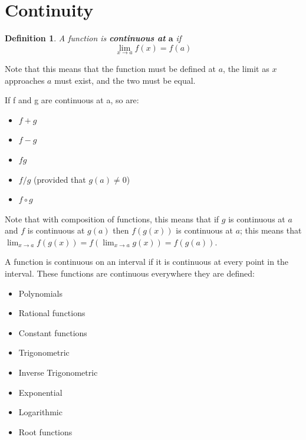 \documentclass[letterpaper, 11pt, openany]{book}
\theoremstyle{mytheoremstyle}
\newtheorem{definition}{Definition}[section]
\theoremstyle{myexamplestyle}
\begin{document}
\section{Continuity}
\setcounter{figure}{0}

\begin{definition}\label{d:continuity}
    A function is \textbf{continuous at} \(\bm{a}\) if
    \[\lim_{x \to a} f(x) = f(a)\]
\end{definition}
Note that this means that the function must be defined at \(a\), the limit as \(x\) approaches \(a\) must exist, and the two must be equal.

If f and g are continuous at a, so are:
\begin{multicols}{2}
    \begin{itemize}
        \item \(f + g\)
        \item \(f - g\)
        \item \(fg\)
        \item \(f/g\) (provided that \(g(a) \neq 0\))
        \item \(f \circ g\)
    \end{itemize}
\end{multicols}

Note that with composition of functions, this means that if \(g\) is continuous at \(a\) and \(f\) is continuous at \(g(a)\) then \(f(g(x))\) is continuous at \(a\); this means that \(\displaystyle \lim_{x\to a} f(g(x)) = f\left(\lim_{x \to a} g(x) \right) = f(g(a))\).

A function is continuous on an interval if it is continuous at every point in the interval. These functions are continuous everywhere they are defined:
\begin{multicols}{2}
    \begin{itemize}
        \item Polynomials
        \item Rational functions
        \item Constant functions
        \item Trigonometric
        \item Inverse Trigonometric
        \item Exponential
        \item Logarithmic
        \item Root functions
    \end{itemize}
\end{multicols}
\end{document}

